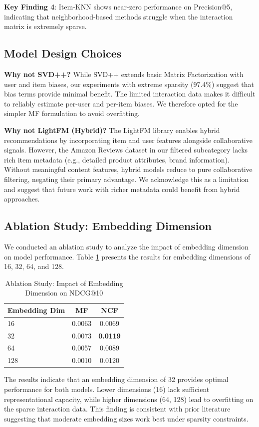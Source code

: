 \textbf{Key Finding 4}: Item-KNN shows near-zero performance on Precision@5, indicating that neighborhood-based methods struggle when the interaction matrix is extremely sparse.

\subsection{Model Design Choices}

\textbf{Why not SVD++?} While SVD++ extends basic Matrix Factorization with user and item biases, our experiments with extreme sparsity (97.4\%) suggest that bias terms provide minimal benefit. The limited interaction data makes it difficult to reliably estimate per-user and per-item biases. We therefore opted for the simpler MF formulation to avoid overfitting.

\textbf{Why not LightFM (Hybrid)?} The LightFM library enables hybrid recommendations by incorporating item and user features alongside collaborative signals. However, the Amazon Reviews dataset in our filtered subcategory lacks rich item metadata (e.g., detailed product attributes, brand information). Without meaningful content features, hybrid models reduce to pure collaborative filtering, negating their primary advantage. We acknowledge this as a limitation and suggest that future work with richer metadata could benefit from hybrid approaches.

\subsection{Ablation Study: Embedding Dimension}

We conducted an ablation study to analyze the impact of embedding dimension on model performance. Table \ref{tab:ablation} presents the results for embedding dimensions of 16, 32, 64, and 128.

\begin{table}[H]
\centering
\caption{Ablation Study: Impact of Embedding Dimension on NDCG@10}
\label{tab:ablation}
\begin{tabular}{lcc}
\hline
\textbf{Embedding Dim} & \textbf{MF} & \textbf{NCF} \\
\hline
16 & 0.0063 & 0.0069 \\
32 & 0.0073 & \textbf{0.0119} \\
64 & 0.0057 & 0.0089 \\
128 & 0.0010 & 0.0120 \\
\hline
\end{tabular}
\end{table}

The results indicate that an embedding dimension of 32 provides optimal performance for both models. Lower dimensions (16) lack sufficient representational capacity, while higher dimensions (64, 128) lead to overfitting on the sparse interaction data. This finding is consistent with prior literature suggesting that moderate embedding sizes work best under sparsity constraints.